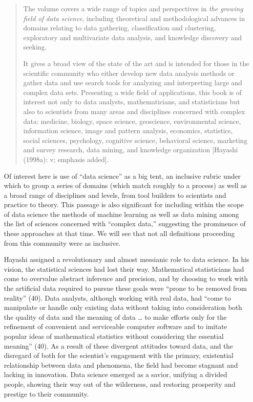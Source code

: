 \documentclass[
  letterpaper,
]{report}
\begin{document}
\begin{quote}
The volume covers a wide range of topics and perspectives in \emph{the
growing field of data science}, including theoretical and methodological
advances in domains relating to data gathering, classification and
clustering, exploratory and multivariate data analysis, and knowledge
discovery and seeking.

It gives a broad view of the state of the art and is intended for those
in the scientific community who either develop new data analysis methods
or gather data and use search tools for analyzing and interpreting large
and complex data sets. Presenting a wide field of applications, this
book is of interest not only to data analysts, mathematicians, and
statisticians but also to scientists from many areas and disciplines
concerned with complex data: medicine, biology, space science,
geoscience, environmental science, information science, image and
pattern analysis, economics, statistics, social sciences, psychology,
cognitive science, behavioral science, marketing and survey research,
data mining, and knowledge organization {[}Hayashi (1998a): v; emphasis
added{]}.
\end{quote}

Of interest here is use of ``data science'' as a big tent, an inclusive
rubric under which to group a series of domains (which match roughly to
a process) as well as a broad range of disciplines and levels, from tool
builders to scientists and practice to theory. This passage is also
significant for including within the scope of data science the methods
of machine learning as well as data mining among the list of sciences
concerned with ``complex data,'' suggesting the prominence of these
approaches at that time. We will see that not all definitions proceeding
from this community were as inclusive.

Hayashi assigned a revolutionary and almost messianic role to data
science. In his vision, the statistical sciences had lost their way.
Mathematical statisticians had come to overvalue abstract inference and
precision, and by choosing to work with the artificial data required to
pursue these goals were ``prone to be removed from reality'' (40). Data
analysts, although working with real data, had ``come to manipulate or
handle only existing data without taking into consideration both the
quality of data and the meaning of data \ldots{} to make efforts only
for the refinement of convenient and serviceable computer software and
to imitate popular ideas of mathematical statistics without considering
the essential meaning'' (40). As a result of these divergent attitudes
toward data, and the disregard of both for the scientist's engagement
with the primary, existential relationship between data and phenomena,
the field had become stagnant and lacking in innovation. Data science
emerged as a savior, unifying a divided people, showing their way out of
the wilderness, and restoring prosperity and prestige to their
community.
\end{document}
